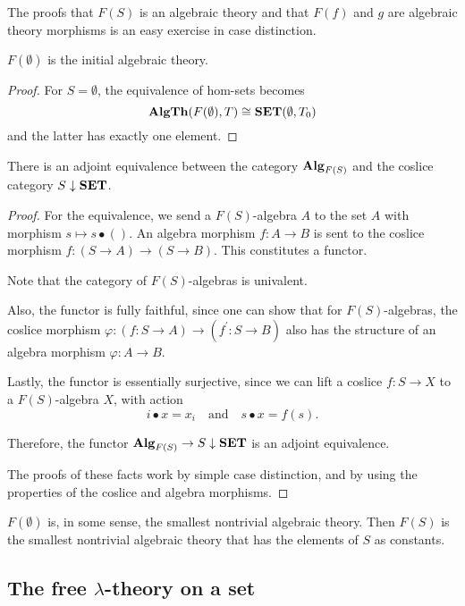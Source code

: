 The proofs that $ F(S) $ is an algebraic theory and that $ F(f) $ and $ g $ are algebraic theory morphisms is an easy exercise in case distinction.

\begin{corollary}
  $ F(\emptyset) $ is the initial algebraic theory.
\end{corollary}
\begin{proof}
  For $ S = \emptyset $, the equivalence of hom-sets becomes
  \[ \mathbf{AlgTh}(F(\emptyset), T) \cong \mathbf{SET}(\emptyset, T_0) \]
  and the latter has exactly one element.
\end{proof}

\begin{lemma}
  There is an adjoint equivalence between the category $ \mathbf{Alg}_{F(S)} $ and the coslice category $ S \downarrow \mathbf{SET} $.
\end{lemma}
\begin{proof}
  For the equivalence, we send a $ F(S) $-algebra $ A $ to the set $ A $ with morphism $ s \mapsto s \bullet () $. An algebra morphism $ f: A \to B $ is sent to the coslice morphism $ f: (S \to A) \to (S \to B) $. This constitutes a functor.

  Note that the category of $ F(S) $-algebras is univalent.

  Also, the functor is fully faithful, since one can show that for $ F(S) $-algebras, the coslice morphism $ \varphi: (f: S \to A) \to (f^\prime: S \to B) $ also has the structure of an algebra morphism $ \varphi: A \to B $.

  Lastly, the functor is essentially surjective, since we can lift a coslice $ f: S \to X $ to a $ F(S) $-algebra $ X $, with action
  \[ i \bullet x = x_i \quad \text{and} \quad s \bullet x = f(s). \]

  Therefore, the functor $ \mathbf{Alg}_{F(S)} \to S \downarrow \mathbf{SET} $ is an adjoint equivalence.

  The proofs of these facts work by simple case distinction, and by using the properties of the coslice and algebra morphisms.
\end{proof}

$ F(\emptyset) $ is, in some sense, the smallest nontrivial algebraic theory. Then $ F(S) $ is the smallest nontrivial algebraic theory that has the elements of $ S $ as constants.

\subsection{The free \texorpdfstring{$ \lambda $}{lambda}-theory on a set}

